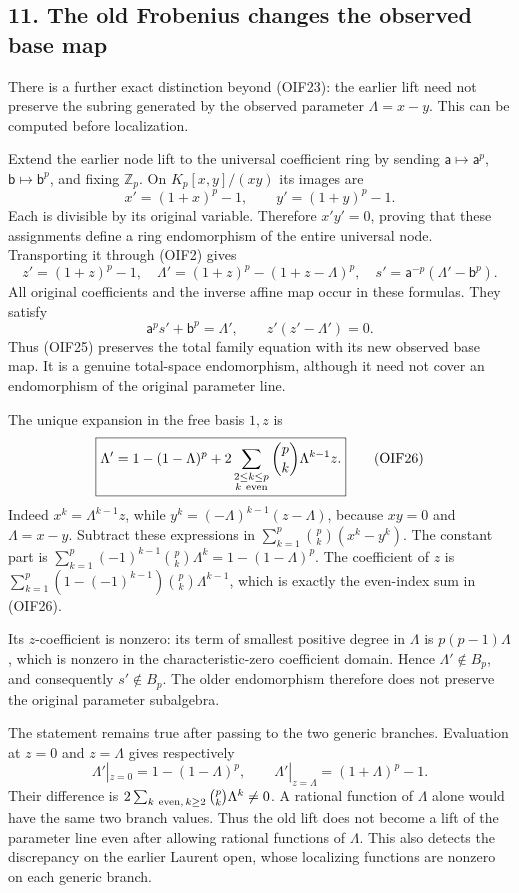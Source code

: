 \documentclass[
]{article}
\begin{document}
\subsection{11. The old Frobenius changes the observed base
map}\label{the-old-frobenius-changes-the-observed-base-map}

There is a further exact distinction beyond (OIF23): the earlier lift
need not preserve the subring generated by the observed parameter
\(\Lambda=x-y\). This can be computed before localization.

Extend the earlier node lift to the universal coefficient ring by
sending \(\mathsf a\mapsto\mathsf a^p\),
\(\mathsf b\mapsto\mathsf b^p\), and fixing \(\mathbb Z_p\). On
\(K_p[x,y]/(xy)\) its images are \[
x'=(1+x)^p-1,\qquad y'=(1+y)^p-1.
\] Each is divisible by its original variable. Therefore \(x'y'=0\),
proving that these assignments define a ring endomorphism of the entire
universal node. Transporting it through (OIF2) gives \[
z'=(1+z)^p-1,\quad
\Lambda'=(1+z)^p-(1+z-\Lambda)^p,\quad
s'=\mathsf a^{-p}(\Lambda'-\mathsf b^p).
\tag{OIF25}
\] All original coefficients and the inverse affine map occur in these
formulas. They satisfy \[
\mathsf a^p s'+\mathsf b^p=\Lambda',
\qquad z'(z'-\Lambda')=0.
\] Thus (OIF25) preserves the total family equation with its new
observed base map. It is a genuine total-space endomorphism, although it
need not cover an endomorphism of the original parameter line.

The unique expansion in the free basis \(1,z\) is \[
\boxed{\Lambda'=1-(1-\Lambda)^p+
2\sum_{\substack{2\le k\le p\\k\ {\rm even}}}
\binom pk\Lambda^{k-1}z.}
\tag{OIF26}
\] Indeed \(x^k=\Lambda^{k-1}z\), while
\(y^k=(-\Lambda)^{k-1}(z-\Lambda)\), because \(xy=0\) and
\(\Lambda=x-y\). Subtract these expressions in
\(\sum_{k=1}^p\binom pk(x^k-y^k)\). The constant part is
\(\sum_{k=1}^p(-1)^{k-1}\binom pk\Lambda^k=1-(1-\Lambda)^p\). The
coefficient of \(z\) is
\(\sum_{k=1}^p(1-(-1)^{k-1})\binom pk\Lambda^{k-1}\), which is exactly
the even-index sum in (OIF26).

Its \(z\)-coefficient is nonzero: its term of smallest positive degree
in \(\Lambda\) is \(p(p-1)\Lambda\), which is nonzero in the
characteristic-zero coefficient domain. Hence \(\Lambda'\notin B_p\),
and consequently \(s'\notin B_p\). The older endomorphism therefore does
not preserve the original parameter subalgebra.

The statement remains true after passing to the two generic branches.
Evaluation at \(z=0\) and \(z=\Lambda\) gives respectively \[
\Lambda'|_{z=0}=1-(1-\Lambda)^p,\qquad
\Lambda'|_{z=\Lambda}=(1+\Lambda)^p-1.
\tag{OIF27}
\] Their difference is
\(2\sum_{k\ {\rm even},\,k\ge2}\binom pk\Lambda^k\ne0\). A rational
function of \(\Lambda\) alone would have the same two branch values.
Thus the old lift does not become a lift of the parameter line even
after allowing rational functions of \(\Lambda\). This also detects the
discrepancy on the earlier Laurent open, whose localizing functions are
nonzero on each generic branch.
\end{document}
